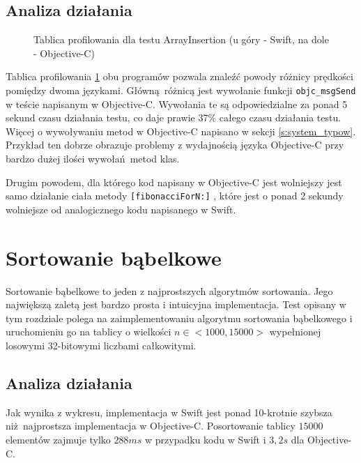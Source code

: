 \documentclass[mgr, shortabstract]{iithesis}
\newcommand{\objcinline}[1]{
    \texttt{#1}
}
\begin{document}
\subsection{Analiza działania}

\begin{figure}
    \caption{Tablica profilowania dla testu ArrayInsertion (u góry - Swift, na dole - Objective-C)}
    \label{i:fibonacci}
\end{figure}

Tablica profilowania \ref{i:fibonacci} obu programów pozwala znaleźć powody różnicy prędkości pomiędzy dwoma językami. Główną różnicą jest wywołanie funkcji \objcinline{objc_msgSend } w teście napisanym w Objective-C. Wywołania te są odpowiedzialne za ponad 5 sekund czasu działania testu, co daje prawie 37\% całego czasu działania testu. Więcej o wywoływaniu metod w Objective-C napisano w sekcji \ref{s:system_typow}. Przykład ten dobrze obrazuje problemy z wydajnością języka Objective-C przy bardzo dużej ilości wywołań metod klas.

Drugim powodem, dla którego kod napisany w Objective-C jest wolniejszy jest samo działanie ciała metody \objcinline{[fibonacciForN:]}, które jest o ponad 2 sekundy wolniejsze od analogicznego kodu napisanego w Swift.

\section{Sortowanie bąbelkowe}
Sortowanie bąbelkowe to jeden z najprostszych algorytmów sortowania. Jego największą zaletą jest bardzo prosta i intuicyjna implementacja. Test opisany w tym rozdziale polega na zaimplementowaniu algorytmu sortowania bąbelkowego i uruchomieniu go na tablicy o wielkości $n \in <1000, 15000>$ wypełnionej losowymi 32-bitowymi liczbami całkowitymi.

\subsection{Analiza działania}

Jak wynika z wykresu, implementacja w Swift jest ponad 10-krotnie szybsza niż najprostsza implementacja w Objective-C. Posortowanie tablicy $15000$ elementów zajmuje tylko $288 ms$ w przypadku kodu w Swift i $3,2 s$ dla Objective-C.
\end{document}
